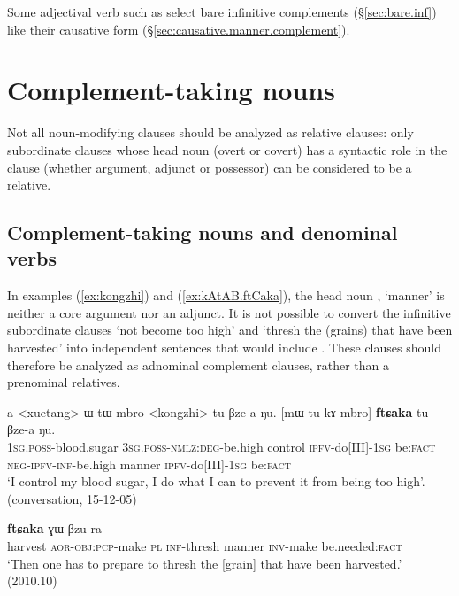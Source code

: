 Some adjectival verb such as  select bare infinitive complements (§\ref{sec:bare.inf}) like their causative form (§\ref{sec:causative.manner.complement}).



  \section{Complement-taking nouns} \label{sec:complement.taking.nouns}
 Not all noun-modifying clauses should be analyzed as relative clauses: only subordinate clauses whose head noun (overt or covert) has a syntactic role in the clause (whether argument, adjunct or possessor) can be considered to be a relative.

\subsection{Complement-taking nouns and denominal verbs}  \label{sec:compl.taking.nouns.denominal}
In examples (\ref{ex:kongzhi}) and (\ref{ex:kAtAB.ftCaka}), the head noun , `manner' is neither a core argument nor an adjunct. It is not possible to convert the infinitive subordinate clauses  `not become too high' and  `thresh the (grains) that have been harvested' into independent sentences that would include . These clauses  should therefore be analyzed as adnominal complement clauses, rather than a prenominal relatives.
  
 \begin{exe}
\ex \label{ex:kongzhi}
\gll a-<xuetang> ɯ-tɯ-mbro <kongzhi> tu-βze-a ŋu. [mɯ-tu-kɤ-mbro] \textbf{ftɕaka} tu-βze-a ŋu. \\
  \textsc{1sg}.\textsc{poss}-blood.sugar \textsc{3sg}.\textsc{poss}-\textsc{nmlz}:\textsc{deg}-be.high control \textsc{ipfv}-do[III]-\textsc{1sg} be:\textsc{fact} \textsc{neg}-\textsc{ipfv}-\textsc{inf}-be.high manner \textsc{ipfv}-do[III]-\textsc{1sg} be:\textsc{fact} \\
\glt `I control my blood sugar, I do what I can to prevent it from being too high'. (conversation, 15-12-05)
\end{exe}
  
 \begin{exe}
\ex \label{ex:kAtAB.ftCaka}
 \textbf{ftɕaka} ɣɯ-βzu ra   \\
 harvest \textsc{aor}-\textsc{obj}:\textsc{pcp}-make \textsc{pl} \textsc{inf}-thresh manner \textsc{inv}-make be.needed:\textsc{fact} \\
 \glt `Then one has to prepare to thresh the [grain] that have been harvested.' (2010.10)
\end{exe}
 
